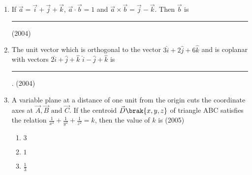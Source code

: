 \begin{enumerate}[label=\thesubsection.\arabic*.,ref=\thesubsection.\theenumi]
\begin{enumerate}
\end{enumerate}
\item If $\vec{a}=\vec{i}+\vec{j}+\vec{k}$, $\vec{a} \cdot \vec{b}=1$ and $\vec{a} \times \vec{b} = \vec{j} - \vec{k}$. Then $\vec{b}$ is \rule{1cm}{0.01pt}
\hfill (2004)
\iffalse
\begin{enumerate}
\begin{multicols}{2}
    \item $\vec{i}-\vec{j}+\vec{k}$
    \item $2\vec{j}-\vec{k}$
    \item $\vec{i}$
    \item $2\vec{i}$
\end{multicols}
\end{enumerate}
\fi
    \item The unit vector which is orthogonal to the vector $3\hat{i} + 2\hat{j} + 6\hat{k}$ and is coplanar with vectors $2\hat{i} + \hat{j} + \hat{k}$  $\hat{i} - \hat{j} + \hat{k}$ is \rule{1cm}{0.01pt}.
    \hfill{(2004)}
    \iffalse
    \begin{multicols}{4}
    	\begin{enumerate}[itemsep=1ex]
    		\item $\frac{2\hat{i} - 6\hat{j} + \hat{k}}{\sqrt{41}}$
    		\item $\frac{2\hat{i} - 3\hat{j}}{\sqrt{13}}$
    		\item $\frac{3\hat{i} - \hat{k}}{\sqrt{10}}$
    		\item $\frac{4\hat{i} + 3\hat{j} - 3\hat{k}}{\sqrt{34}}$
    	\end{enumerate}
    \end{multicols}
\fi
    \item A variable plane at a distance of one unit from the origin cuts the coordinate axes at $\vec{A}, \vec{B} \text{ and } \vec{C}$. If the centroid $\vec{D} \brak{x,y,z}$ of triangle ABC satisfies the relation $\frac{1}{x^{2}} + \frac{1}{y^{2}} + \frac{1}{z^{2}} = k$, then the value of $k$ is
    \hfill{(2005)}
    \begin{multicols}{4}
    	\begin{enumerate}
    		\item $3$
    		\item $1$
    		\item $\frac{1}{3}$

\end{enumerate}
\end{multicols}
\end{enumerate}
